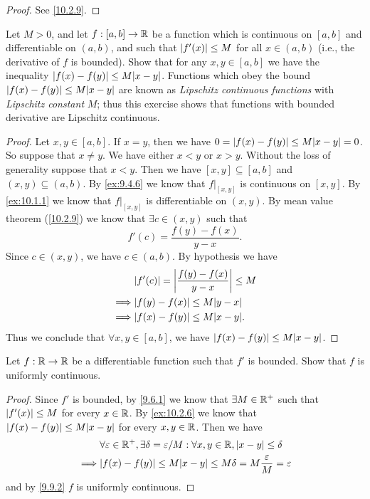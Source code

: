 \begin{proof}
  See \cref{10.2.9}.
\end{proof}

\begin{ex}\label{ex:10.2.6}
  Let \(M > 0\), and let \(f : [a, b] \to \mathbb{R}\) be a function which is continuous on \([a, b]\) and differentiable on \((a, b)\), and such that \(\left\lvert f'(x)\right\rvert \leq M\) for all \(x \in (a, b)\) (i.e., the derivative of \(f\) is bounded).
  Show that for any \(x, y \in [a, b]\) we have the inequality \(\abs{f(x) - f(y)} \leq M \abs{x - y}\).
  Functions which obey the bound \(\abs{f(x) - f(y)} \leq M \abs{x - y}\) are known as \emph{Lipschitz continuous functions} with \emph{Lipschitz constant} \(M\);
  thus this exercise shows that functions with bounded derivative are Lipschitz continuous.
\end{ex}

\begin{proof}
  Let \(x, y \in [a, b]\).
  If \(x = y\), then we have \(0 = \abs{f(x) - f(y)} \leq M \abs{x - y} = 0\).
  So suppose that \(x \neq y\).
  We have either \(x < y\) or \(x > y\).
  Without the loss of generality suppose that \(x < y\).
  Then we have \([x, y] \subseteq [a, b]\) and \((x, y) \subseteq (a, b)\).
  By \cref{ex:9.4.6} we know that \(f|_{[x, y]}\) is continuous on \([x, y]\).
  By \cref{ex:10.1.1} we know that \(f|_{[x, y]}\) is differentiable on \((x, y)\).
  By mean value theorem (\cref{10.2.9}) we know that \(\exists c \in (x, y)\) such that
  \[
    f'(c) = \dfrac{f(y) - f(x)}{y - x}.
  \]
  Since \(c \in (x, y)\), we have \(c \in (a, b)\).
  By hypothesis we have
  \begin{align*}
             & \abs{f'(c)} = \abs{\dfrac{f(y) - f(x)}{y - x}} \leq M \\
    \implies & \abs{f(y) - f(x)} \leq M \abs{y - x}                  \\
    \implies & \abs{f(x) - f(y)} \leq M \abs{x - y}.
  \end{align*}
  Thus we conclude that \(\forall x, y \in [a, b]\), we have \(\abs{f(x) - f(y)} \leq M \abs{x - y}\).
\end{proof}

\begin{ex}\label{ex:10.2.7}
  Let \(f : \mathbb{R} \to \mathbb{R}\) be a differentiable function such that \(f'\) is bounded.
  Show that \(f\) is uniformly continuous.
\end{ex}

\begin{proof}
  Since \(f'\) is bounded, by \cref{9.6.1} we know that \(\exists M \in \mathbb{R}^+\) such that \(\left\lvert f'(x)\right\rvert \leq M\) for every \(x \in \mathbb{R}\).
  By \cref{ex:10.2.6} we know that \(\abs{f(x) - f(y)} \leq M \abs{x - y}\) for every \(x, y \in \mathbb{R}\).
  Then we have
  \begin{align*}
             & \forall \varepsilon \in \R^+, \exists \delta = \varepsilon / M : \forall x, y \in \R, \abs{x - y} \leq \delta \\
    \implies & \abs{f(x) - f(y)} \leq M \abs{x - y} \leq M \delta = M \dfrac{\varepsilon}{M} = \varepsilon
  \end{align*}
  and by \cref{9.9.2} \(f\) is uniformly continuous.
\end{proof}

